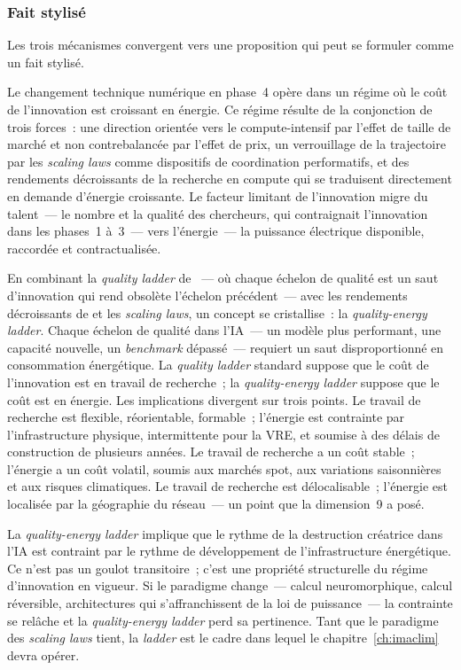 \subsubsection{Fait stylisé}

Les trois mécanismes convergent vers une proposition qui peut se formuler comme un fait stylisé.

Le changement technique numérique en phase~4 opère dans un régime où le coût de l'innovation est croissant en énergie. Ce régime résulte de la conjonction de trois forces~: une direction orientée vers le compute-intensif par l'effet de taille de marché et non contrebalancée par l'effet de prix, un verrouillage de la trajectoire par les \emph{scaling laws} comme dispositifs de coordination performatifs, et des rendements décroissants de la recherche en compute qui se traduisent directement en demande d'énergie croissante. Le facteur limitant de l'innovation migre du talent~--- le nombre et la qualité des chercheurs, qui contraignait l'innovation dans les phases~1 à~3~--- vers l'énergie~--- la puissance électrique disponible, raccordée et contractualisée.

En combinant la \emph{quality ladder} de \textcite{aghion_model_1992}~--- où chaque échelon de qualité est un saut d'innovation qui rend obsolète l'échelon précédent~--- avec les rendements décroissants de \textcite{bloom_ideas_2020} et les \emph{scaling laws}, un concept se cristallise~: la \emph{quality-energy ladder}. Chaque échelon de qualité dans l'IA~--- un modèle plus performant, une capacité nouvelle, un \emph{benchmark} dépassé~--- requiert un saut disproportionné en consommation énergétique. La \emph{quality ladder} standard suppose que le coût de l'innovation est en travail de recherche~; la \emph{quality-energy ladder} suppose que le coût est en énergie. Les implications divergent sur trois points. Le travail de recherche est flexible, réorientable, formable~; l'énergie est contrainte par l'infrastructure physique, intermittente pour la VRE, et soumise à des délais de construction de plusieurs années. Le travail de recherche a un coût stable~; l'énergie a un coût volatil, soumis aux marchés spot, aux variations saisonnières et aux risques climatiques. Le travail de recherche est délocalisable~; l'énergie est localisée par la géographie du réseau~--- un point que la dimension~9 a posé.

La \emph{quality-energy ladder} implique que le rythme de la destruction créatrice dans l'IA est contraint par le rythme de développement de l'infrastructure énergétique. Ce n'est pas un goulot transitoire~; c'est une propriété structurelle du régime d'innovation en vigueur. Si le paradigme change~--- calcul neuromorphique, calcul réversible, architectures qui s'affranchissent de la loi de puissance~--- la contrainte se relâche et la \emph{quality-energy ladder} perd sa pertinence. Tant que le paradigme des \emph{scaling laws} tient, la \emph{ladder} est le cadre dans lequel le chapitre~\ref{ch:imaclim} devra opérer.

